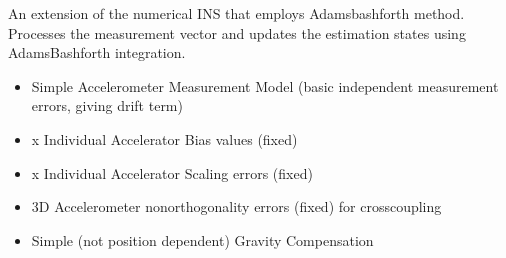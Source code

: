 \documentclass[letterpaper,10pt,english]{sphinxmanual}
\begin{document}
\begin{fulllineitems}
\label{\detokenize{modules/fusion/ins:qnav.fusion.ins.AdamsBashforth}}
\pysigstartsignatures
{}
\pysigstopsignatures
\sphinxAtStartPar
An extension of the numerical INS that employs Adams\sphinxhyphen{}bashforth method.
Processes the measurement vector and updates the estimation states using
Adams\sphinxhyphen{}Bashforth integration.
\begin{description}
\begin{itemize}
\item {} 
\sphinxAtStartPar
Simple Accelerometer Measurement Model (basic \sphinxhyphen{} independent
measurement errors, giving drift term)

\item {} 
 x Individual Accelerator Bias values (fixed)

\item {} 
 x Individual Accelerator Scaling errors (fixed)

\item {} 
\sphinxAtStartPar
3D Accelerometer non\sphinxhyphen{}orthogonality errors (fixed) for cross\sphinxhyphen{}coupling

\item {} 
\sphinxAtStartPar
Simple (not position dependent) Gravity Compensation


\end{itemize}
\end{description}
\end{fulllineitems}
\end{document}
